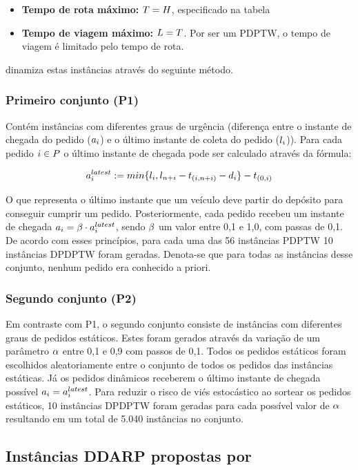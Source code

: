 \documentclass{anpet}
\begin{document}
\begin{itemize}
\begin{itemize}
    \end{itemize}
    \item \textbf{Tempo de rota máximo:} $T = H$, especificado na tabela
    \item \textbf{Tempo de viagem máximo:} $L = T$. Por ser um PDPTW, o tempo de viagem é limitado pelo tempo de rota.
\end{itemize}



\textcite{pankratz_dynamic_2005} dinamiza estas instâncias através do seguinte método.

\subsubsection{Primeiro conjunto (P1)}
Contém instâncias com diferentes graus de urgência (diferença entre o instante de chegada do pedido ($a_i$) e o último instante de coleta do pedido ($l_i{}$)). Para cada pedido $i{} \in P$ o último instante de chegada pode ser calculado através da fórmula:

\begin{equation}
    a{}_{i{}}^{latest} := min\{l_i{}, l_{n{} + i{}} - t_{(i{},{n{} + i{}})} - d_i{}\} - t_{(0,i{})}
    \label{eq:pankratz_dynamic_2005_requestLatestArrivalTime}
\end{equation}

O que representa o último instante que um veículo deve partir do depósito para conseguir cumprir um pedido. Posteriormente, cada pedido recebeu um instante de chegada $a_i = \beta \cdot a{}_{i{}}^{latest}$, sendo $\beta$ um valor entre 0,1 e 1,0, com passas de 0,1. De acordo com esses princípios, para cada uma das 56 instâncias PDPTW 10 instâncias DPDPTW foram geradas. Denota-se que para todas as instâncias desse conjunto, nenhum pedido era conhecido a priori.

\subsubsection{Segundo conjunto (P2)}
Em contraste com P1, o segundo conjunto consiste de instâncias com diferentes graus de pedidos estáticos. Estes foram gerados através da variação de um parâmetro $\alpha$ entre 0,1 e 0,9 com passos de 0,1. Todos os pedidos estáticos foram escolhidos aleatoriamente entre o conjunto de todos os pedidos das instâncias estáticas. Já os pedidos dinâmicos receberem o último instante de chegada possível $a_i = a{}_{i{}}^{latest}$. Para reduzir o risco de viés estocástico ao sortear os pedidos estáticos, 10 instâncias DPDPTW foram geradas para cada possível valor de $\alpha$ resultando em um total de 5.040 instâncias no conjunto.

\subsection{Instâncias DDARP propostas por }

\printbibliography
\end{document}
